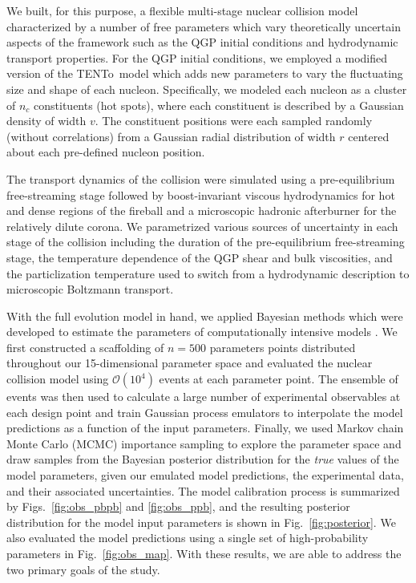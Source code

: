 \documentclass[aps,prc,reprint,amsmath,nofootinbib]{revtex4-1}
\newcommand{\trento}{T\raisebox{-0.5ex}{R}ENTo}
\newcommand{\order}[1]{$\mathcal O(10^{#1})$}
\begin{document}
We built, for this purpose, a flexible multi-stage nuclear collision model characterized by a number of free parameters which vary theoretically uncertain aspects of the framework such as the QGP initial conditions and hydrodynamic transport properties.
For the QGP initial conditions, we employed a modified version of the \trento\ model \cite{Moreland:2014oya} which adds new parameters to vary the fluctuating size and shape of each nucleon.
Specifically, we modeled each nucleon as a cluster of $n_c$ constituents (hot spots), where each constituent is described by a Gaussian density of width $v$.
The constituent positions were each sampled randomly (without correlations) from a Gaussian radial distribution of width $r$ centered about each pre-defined nucleon position.

The transport dynamics of the collision were simulated using a pre-equilibrium free-streaming stage followed by boost-invariant viscous hydrodynamics for hot and dense regions of the fireball and a microscopic hadronic afterburner for the relatively dilute corona.
We parametrized various sources of uncertainty in each stage of the collision including the duration of the pre-equilibrium free-streaming stage, the temperature dependence of the QGP shear and bulk viscosities, and the particlization temperature used to switch from a hydrodynamic description to microscopic Boltzmann transport.

With the full evolution model in hand, we applied Bayesian methods which were developed to estimate the parameters of computationally intensive models \cite{OHagan:2006ba, Higdon:2008cmc, Higdon:2014tva}.
We first constructed a scaffolding of $n=500$ parameters points distributed throughout our 15-dimensional parameter space and evaluated the nuclear collision model using \order{4} events at each parameter point.
The ensemble of events was then used to calculate a large number of experimental observables at each design point and train Gaussian process emulators to interpolate the model predictions as a function of the input parameters.
Finally, we used Markov chain Monte Carlo (MCMC) importance sampling to explore the parameter space and draw samples from the Bayesian posterior distribution for the \emph{true} values of the model parameters, given our emulated model predictions, the experimental data, and their associated uncertainties.
The model calibration process is summarized by Figs.~\ref{fig:obs_pbpb} and \ref{fig:obs_ppb}, and the resulting posterior distribution for the model input parameters is shown in Fig.~\ref{fig:posterior}.
We also evaluated the model predictions using a single set of high-probability parameters in Fig.~\ref{fig:obs_map}.
With these results, we are able to address the two primary goals of the study.
\end{document}
